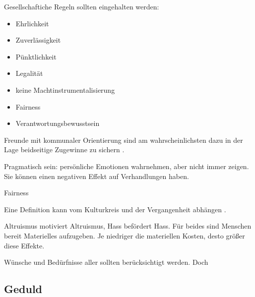 \begin{frame}
  Gesellschaftiche Regeln sollten eingehalten werden:

  \begin{itemize}
    \item Ehrlichkeit
    \item Zuverlässigkeit
    \item Pünktlichkeit
    \item Legalität
    \item keine Machtinstrumentalisierung
    \item Fairness
    \item Verantwortungsbewusstsein 
  \end{itemize}

  Freunde mit kommunaler Orientierung sind am wahrscheinlichsten dazu in der Lage beidseitige Zugewinne zu sichern \cite[][p. 502]{thompson_negotiation_2010}.
  
  Pragmatisch sein: persönliche Emotionen wahrnehmen, aber nicht immer zeigen. Sie können einen negativen Effekt auf Verhandlungen haben. \cite[][p. 13]{mccarthy_advanced_2015}
\end{frame}

\begin{frame}{Fairness}

  Eine Definition kann vom Kulturkreis und der Vergangenheit abhängen \cite{rabin_incorporating_1993}. 
  
  Altruismus motiviert Altruismus, Hass befördert Hass. Für beides sind Menschen bereit Materielles aufzugeben. Je niedriger die materiellen Kosten, desto größer diese Effekte. \cite{rabin_incorporating_1993}

  Wünsche und Bedürfnisse aller sollten berücksichtigt werden. Doch  

\end{frame}

\subsection{Geduld} \label{sec:geduld}

